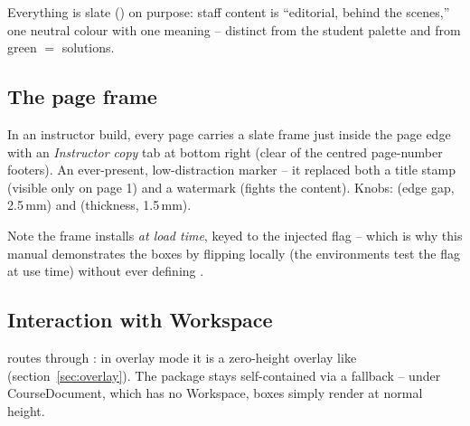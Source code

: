 Everything is slate () on purpose: staff content is
``editorial, behind the scenes,'' one neutral colour with one meaning --
distinct from the student palette and from green $=$ solutions.

\subsection*{The page frame}

In an instructor build, every page carries a slate frame just inside the
page edge with an \emph{Instructor copy} tab at bottom right (clear of the
centred page-number footers). An ever-present, low-distraction marker --
it replaced both a title stamp (visible only on page 1) and a watermark
(fights the content). Knobs:  (edge gap, 2.5\,mm)
and  (thickness, 1.5\,mm).

Note the frame installs \emph{at load time}, keyed to the injected flag --
which is why this manual demonstrates the boxes by flipping
 locally (the environments test the flag at use
time) without ever defining .

\subsection*{Interaction with Workspace}

 routes through : in overlay mode it is
a zero-height overlay like  (section~\ref{sec:overlay}). The
package stays self-contained via a fallback -- under CourseDocument, which
has no Workspace, boxes simply render at normal height.

